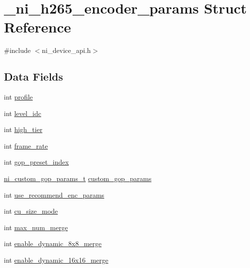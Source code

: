 \hypertarget{struct__ni__h265__encoder__params}{}\section{\+\_\+ni\+\_\+h265\+\_\+encoder\+\_\+params Struct Reference}
\label{struct__ni__h265__encoder__params}


{\ttfamily \#include $<$ni\+\_\+device\+\_\+api.\+h$>$}

\subsection*{Data Fields}
\begin{DoxyCompactItemize}
\item 
int \mbox{\hyperlink{struct__ni__h265__encoder__params_a41cdb4a229a3d71837d607124f8a07a4}{profile}}
\item 
int \mbox{\hyperlink{struct__ni__h265__encoder__params_ab4a08f9d64a0d901c25eed4855931c4f}{level\+\_\+idc}}
\item 
int \mbox{\hyperlink{struct__ni__h265__encoder__params_a9ee92d08bee21b03c9b7ba79592e7f57}{high\+\_\+tier}}
\item 
int \mbox{\hyperlink{struct__ni__h265__encoder__params_a30b38dbacfbdef6a3e9a33f6feefb6cc}{frame\+\_\+rate}}
\item 
int \mbox{\hyperlink{struct__ni__h265__encoder__params_ad0f3c78d3822f30b1ab84612ef0e7bcd}{gop\+\_\+preset\+\_\+index}}
\item 
\mbox{\hyperlink{ni__device__api_8h_aa270bcddd5fd34880207abe21ac6ce31}{ni\+\_\+custom\+\_\+gop\+\_\+params\+\_\+t}} \mbox{\hyperlink{struct__ni__h265__encoder__params_a527c5bcdee05a1fe4ec5d8493aa5c795}{custom\+\_\+gop\+\_\+params}}
\item 
int \mbox{\hyperlink{struct__ni__h265__encoder__params_adc903dccf6e4a3f07bf75e217746a385}{use\+\_\+recommend\+\_\+enc\+\_\+params}}
\item 
int \mbox{\hyperlink{struct__ni__h265__encoder__params_afb6a6b097bc20cdd486f8d5080ae3fdb}{cu\+\_\+size\+\_\+mode}}
\item 
int \mbox{\hyperlink{struct__ni__h265__encoder__params_aedcd486a694046c0fa431385d675d6ae}{max\+\_\+num\+\_\+merge}}
\item 
int \mbox{\hyperlink{struct__ni__h265__encoder__params_a55fb30a8806fbf5e11151bbd24c1b54e}{enable\+\_\+dynamic\+\_\+8x8\+\_\+merge}}
\item 
int \mbox{\hyperlink{struct__ni__h265__encoder__params_a0951dd10ed1c02130e4801d8a313524f}{enable\+\_\+dynamic\+\_\+16x16\+\_\+merge}}

\end{DoxyCompactItemize}
